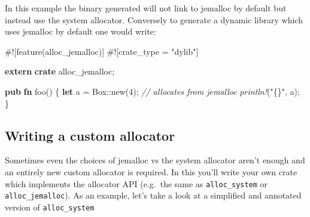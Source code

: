 \documentclass[a4paper,]{book}
\newenvironment{Shaded}{\begin{snugshade}}{\end{snugshade}}
\newcommand{\KeywordTok}[1]{\textcolor[rgb]{0.13,0.29,0.53}{\textbf{{#1}}}}
\newcommand{\DataTypeTok}[1]{\textcolor[rgb]{0.13,0.29,0.53}{{#1}}}
\newcommand{\DecValTok}[1]{\textcolor[rgb]{0.00,0.00,0.81}{{#1}}}
\newcommand{\StringTok}[1]{\textcolor[rgb]{0.31,0.60,0.02}{{#1}}}
\newcommand{\CommentTok}[1]{\textcolor[rgb]{0.56,0.35,0.01}{\textit{{#1}}}}
\newcommand{\PreprocessorTok}[1]{\textcolor[rgb]{0.56,0.35,0.01}{\textit{{#1}}}}
\newcommand{\AttributeTok}[1]{\textcolor[rgb]{0.77,0.63,0.00}{{#1}}}
\newcommand{\NormalTok}[1]{{#1}}
\begin{document}
In this example the binary generated will not link to jemalloc by
default but instead use the system allocator. Conversely to generate a
dynamic library which uses jemalloc by default one would write:

\begin{Shaded}
\begin{Highlighting}[]
\AttributeTok{#![}\NormalTok{feature}\AttributeTok{(}\NormalTok{alloc_jemalloc}\AttributeTok{)]}
\AttributeTok{#![}\NormalTok{crate_type }\AttributeTok{=} \StringTok{"dylib"}\AttributeTok{]}

\KeywordTok{extern} \KeywordTok{crate} \NormalTok{alloc_jemalloc;}

\KeywordTok{pub} \KeywordTok{fn} \NormalTok{foo() \{}
    \KeywordTok{let} \NormalTok{a = }\DataTypeTok{Box}\NormalTok{::new(}\DecValTok{4}\NormalTok{); }\CommentTok{// allocates from jemalloc}
    \PreprocessorTok{println!}\NormalTok{(}\StringTok{"\{\}"}\NormalTok{, a);}
\NormalTok{\}}
\end{Highlighting}
\end{Shaded}

\subsection{Writing a custom
allocator}\label{writing-a-custom-allocator}

Sometimes even the choices of jemalloc vs the system allocator aren't
enough and an entirely new custom allocator is required. In this you'll
write your own crate which implements the allocator API (e.g.~the same
as \texttt{alloc\_system} or \texttt{alloc\_jemalloc}). As an example,
let's take a look at a simplified and annotated version of
\texttt{alloc\_system}
\end{document}
